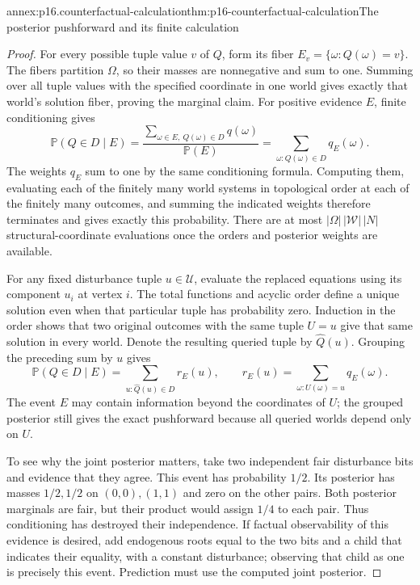 \begin{annexitem}{annex:p16.counterfactual-calculation}{thm:p16-counterfactual-calculation}{The posterior pushforward and its finite calculation}
\begin{proof}
For every possible tuple value \(v\) of \(Q\), form its fiber
\(E_v=\{\omega:Q(\omega)=v\}\). The fibers partition
\(\Omega\), so their masses are nonnegative and sum to one.
Summing over all tuple values with the specified coordinate in one
world gives exactly that world's solution fiber, proving the marginal
claim. For positive evidence \(E\), finite conditioning gives
\[
 \mathbb P(Q\in D\mid E)
  =\frac{\sum_{\omega\in E,\ Q(\omega)\in D}q(\omega)}{\mathbb P(E)}
  =\sum_{\omega:Q(\omega)\in D}q_E(\omega).
\]
The weights \(q_E\) sum to one by the same conditioning formula.
Computing them, evaluating each of the finitely many world systems
in topological order at each of the finitely many outcomes, and
summing the indicated weights therefore terminates and gives exactly
this probability. There are at most
\(|\Omega|\,|\mathcal W|\,|N|\) structural-coordinate evaluations
once the orders and posterior weights are available.

For any fixed disturbance tuple \(u\in\mathcal U\), evaluate
the replaced equations using its component \(u_i\) at vertex \(i\).
The total functions and acyclic order define a unique solution even
when that particular tuple has probability zero. Induction in the
order shows that two original outcomes with the same tuple \(U=u\)
give that same solution in every world. Denote the resulting queried
tuple by \(\widehat Q(u)\). Grouping the preceding sum by \(u\)
gives
\[
 \mathbb P(Q\in D\mid E)
   =\sum_{u:\widehat Q(u)\in D}r_E(u),
 \qquad
 r_E(u)=\sum_{\omega:U(\omega)=u}q_E(\omega).
\]
The event \(E\) may contain information beyond the coordinates of
\(U\); the grouped posterior still gives the exact pushforward
because all queried worlds depend only on \(U\).

To see why the joint posterior matters, take two independent fair
disturbance bits and evidence that they agree. This event has
probability \(1/2\). Its posterior has masses \(1/2,1/2\) on
\((0,0),(1,1)\) and zero on the other pairs. Both posterior marginals
are fair, but their product would assign \(1/4\) to each pair.
Thus conditioning has destroyed their independence. If factual
observability of this evidence is desired, add endogenous roots equal
to the two bits and a child that indicates their equality, with a
constant disturbance; observing that child as one is precisely this
event. Prediction must use the computed joint posterior.
\end{proof}
\end{annexitem}

